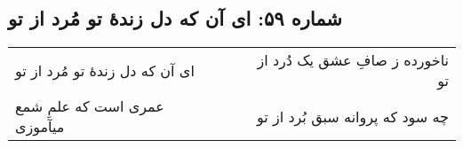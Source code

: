 \begin{center}
\section*{شماره ۵۹: ای آن که دل زندۀ تو مُرد از تو}
\label{sec:059}
\begin{longtable}{l p{0.5cm} r}
ای آن که دل زندهٔ تو مُرد از تو
&&
ناخورده ز صافِ عشق یک دُرد از تو
\\
عمری است که علمِ شمع میآموزی
&&
چه سود که پروانه سبق بُرد از تو
\\
\end{longtable}
\end{center}
